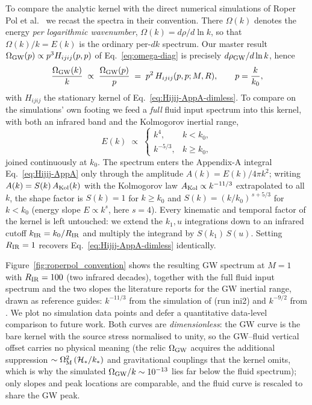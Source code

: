 \documentclass[10pt,prd,aps,nobibnotes,superscriptaddress,preprintnumbers,notitlepage]{revtex4-1}
\begin{document}
To compare the analytic kernel with the direct numerical simulations of
Roper Pol et al.~\cite{RoperPol:2019wvy} we recast the spectra in their convention.
There $\Omega(k)$ denotes the energy \emph{per logarithmic wavenumber},
$\Omega(k)=d\rho/d\ln k$, so that $\Omega(k)/k=E(k)$ is the ordinary per-$dk$
spectrum. Our master result $\Omega_{\rm GW}(p)\propto p^3 H_{ijij}(p,p)$ of
Eq.~\eqref{eq:omega-diag} is precisely $d\rho_{\rm GW}/d\ln k$, hence
\begin{equation}
  \frac{\Omega_{\rm GW}(k)}{k}\;\propto\;\frac{\Omega_{\rm GW}(p)}{p}
  \;=\;p^2\,H_{ijij}(p,p;M,R),\qquad p=\frac{k}{k_0},
  \label{eq:omega-over-k}
\end{equation}
with $H_{ijij}$ the stationary kernel of Eq.~\eqref{eq:Hijij-AppA-dimless}. To
compare on the simulations' own footing we feed a \emph{full} fluid input spectrum
into this kernel, with both an infrared band and the Kolmogorov inertial range,
\begin{equation}
  E(k)\;\propto\;\begin{cases}
    k^{4}, & k<k_0,\\[2pt]
    k^{-5/3}, & k\ge k_0,
  \end{cases}
  \label{eq:full-input-spectrum}
\end{equation}
joined continuously at $k_0$. The spectrum enters the Appendix-A integral
Eq.~\eqref{eq:Hijij-AppA} only through the amplitude $A(k)=E(k)/4\pi k^2$; writing
$A(k)=S(k)\,A_{\rm Kol}(k)$ with the Kolmogorov law $A_{\rm Kol}\propto k^{-11/3}$
extrapolated to all $k$, the shape factor is $S(k)=1$ for $k\ge k_0$ and
$S(k)=(k/k_0)^{\,s+5/3}$ for $k<k_0$ (energy slope $E\propto k^s$, here $s=4$).
Every kinematic and temporal factor of the kernel is left untouched: we extend the
$k_1,u$ integrations down to an infrared cutoff $k_{\rm IR}=k_0/R_{\rm IR}$ and
multiply the integrand by $S(k_1)\,S(u)$. Setting $R_{\rm IR}=1$ recovers
Eq.~\eqref{eq:Hijij-AppA-dimless} identically.

Figure~\ref{fig:roperpol_convention} shows the resulting GW spectrum at $M=1$ with
$R_{\rm IR}=100$ (two infrared decades), together with the full fluid input
spectrum and the two slopes the literature reports for the GW inertial range, drawn
as reference guides: $k^{-11/3}$ from the simulation of \cite{RoperPol:2019wvy} (run
ini2) and $k^{-9/2}$ from \cite{Gogoberidze:2007an}. We plot no simulation data points
and defer a quantitative data-level comparison to future work. Both curves are
\emph{dimensionless}: the GW curve is the bare kernel with the source stress
normalised to unity, so the GW--fluid vertical offset carries no physical meaning
(the relic $\Omega_{\rm GW}$ acquires the additional suppression
$\sim\Omega_{\rm M}^2\,(\mathcal H_\ast/k_\ast)$ and gravitational couplings that
the kernel omits, which is why the simulated $\Omega_{\rm GW}/k\sim10^{-13}$ lies
far below the fluid spectrum); only slopes and peak locations are comparable, and
the fluid curve is rescaled to share the GW peak.
\end{document}
